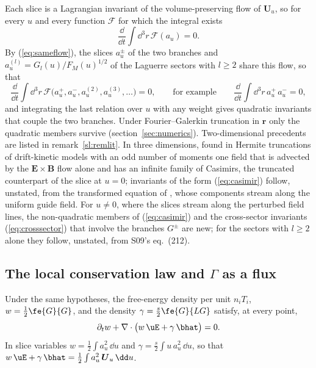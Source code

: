 Each slice is a Lagrangian invariant of the volume-preserving flow of $\boldsymbol U_u$, so for every $u$ and every function $\mathcal F$ for which the integral exists
\begin{equation}\label{eq:casimir}
  \frac{\dd}{\dd t}\int\dd^3r\,\mathcal F(a_u)=0 .
\end{equation}
By (\ref{eq:sameflow}), the slices $a^\pm_u$ of the two branches and $a^{(l)}_u=G_l(u)/F_M(u)^{1/2}$ of the Laguerre sectors with $l\ge2$ share this flow, so that
\begin{equation}\label{eq:crosssector}
  \frac{\dd}{\dd t}\int\dd^3r\,\mathcal F\big(a^+_u,a^-_u,a^{(2)}_u,a^{(3)}_u,\dots\big)=0,\qquad\text{for example}\qquad\frac{\dd}{\dd t}\int\dd^3r\,a^+_u\,a^-_u=0,
\end{equation}
and integrating the last relation over $u$ with any weight gives quadratic invariants that couple the two branches. Under Fourier--Galerkin truncation in $\boldsymbol r$ only the quadratic members survive (section~\ref{sec:numerics}). Two-dimensional precedents are listed in remark~\ref{sl:remlit}. In three dimensions, \citet{Tassi2022} found in Hermite truncations of drift-kinetic models with an odd number of moments one field that is advected by the $\boldsymbol E\times\boldsymbol B$ flow alone \citep[see also][\S3.4]{Tassi2023} and has an infinite family of Casimirs, the truncated counterpart of the slice at $u=0$; invariants of the form (\ref{eq:casimir}) follow, unstated, from the transformed equation of \citet{Heninger2018}, whose components stream along the uniform guide field. For $u\neq0$, where the slices stream along the perturbed field lines, the non-quadratic members of (\ref{eq:casimir}) and the cross-sector invariants (\ref{eq:crosssector}) that involve the branches $G^\pm$ are new; for the sectors with $l\ge2$ alone they follow, unstated, from S09's eq.~(212).

\subsection{The local conservation law and \texorpdfstring{$\Gamma$}{Gamma} as a flux}\label{inv:flux}

\begin{proposition}\label{prop:localflux}
Under the same hypotheses, the free-energy density per unit $n_iT_i$, $w=\tfrac12\fe{G}{G}$, and the density $\gamma=\tfrac{s}{2}\fe{G}{LG}$ satisfy, at every point,
\begin{equation}\label{eq:localflux}
  \partial_tw+\nabla\cdot\big(w\,\uE+\gamma\,\bhat\big)=0 .
\end{equation}
In slice variables $w=\tfrac12\int a_u^2\,\dd u$ and $\gamma=\tfrac{s}{2}\int u\,a_u^2\,\dd u$, so that $w\,\uE+\gamma\,\bhat=\tfrac12\int a_u^2\,\boldsymbol U_u\,\dd u$.
\end{proposition}

